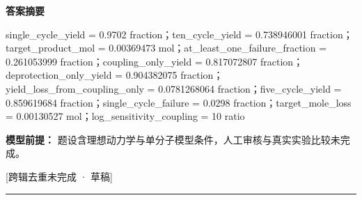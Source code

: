 \documentclass[UTF8,11pt,a4paper]{ctexart}
\begin{document}
\noindent\textbf{答案摘要}\par
single\_cycle\_yield = 0.9702 fraction；ten\_cycle\_yield = 0.738946001 fraction；target\_product\_mol = 0.00369473 mol；at\_least\_one\_failure\_fraction = 0.261053999 fraction；coupling\_only\_yield = 0.817072807 fraction；deprotection\_only\_yield = 0.904382075 fraction；yield\_loss\_from\_coupling\_only = 0.0781268064 fraction；five\_cycle\_yield = 0.859619684 fraction；single\_cycle\_failure = 0.0298 fraction；target\_mole\_loss = 0.00130527 mol；log\_sensitivity\_coupling = 10 ratio\par
\noindent\textbf{模型前提：}
题设含理想动力学与单分子模型条件，人工审核与真实实验比较未完成。\par
\noindent\textcolor{red!65!black}{[跨辑去重未完成 · 草稿]} \par
\medskip\hrule\medskip
{}
\end{document}
